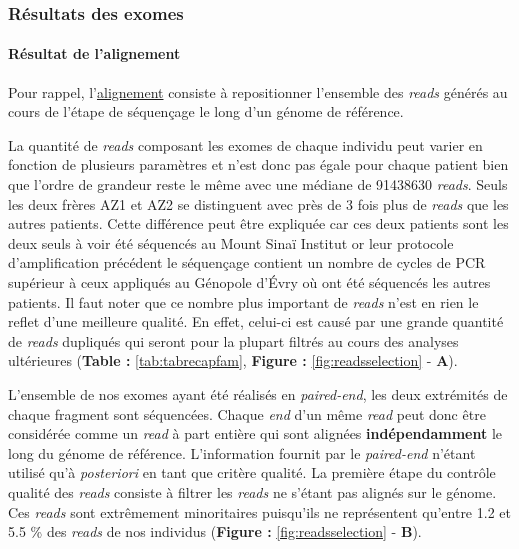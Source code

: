 \documentclass[12pt,twoside]{reedthesis}
\theoremstyle{definition}
\theoremstyle{definition}
\theoremstyle{remark}
\begin{document}
  \newpage  
  
  \subsubsection{Résultats des exomes}\label{resultats-des-exomes}
  
  \paragraph{Résultat de l'alignement}\label{resultat-de-lalignement}
  
  Pour rappel, l'\href{\%7B\#lalignement\%7D}{alignement} consiste à
  repositionner l'ensemble des \emph{reads} générés au cours de l'étape de
  séquençage le long d'un génome de référence.
  
  La quantité de \emph{reads} composant les exomes de chaque individu peut
  varier en fonction de plusieurs paramètres et n'est donc pas égale pour
  chaque patient bien que l'ordre de grandeur reste le même avec une
  médiane de 91438630 \emph{reads}. Seuls les deux frères AZ1 et AZ2 se
  distinguent avec près de 3 fois plus de \emph{reads} que les autres
  patients. Cette différence peut être expliquée car ces deux patients
  sont les deux seuls à voir été séquencés au Mount Sinaï Institut or leur
  protocole d'amplification précédent le séquençage contient un nombre de
  cycles de PCR supérieur à ceux appliqués au Génopole d'Évry où ont été
  séquencés les autres patients. Il faut noter que ce nombre plus
  important de \emph{reads} n'est en rien le reflet d'une meilleure
  qualité. En effet, celui-ci est causé par une grande quantité de
  \emph{reads} dupliqués qui seront pour la plupart filtrés au cours des
  analyses ultérieures (\textbf{Table :} \ref{tab:tabrecapfam},
  \textbf{Figure : }\ref{fig:readsselection} - \textbf{A}).
  
  L'ensemble de nos exomes ayant été réalisés en \emph{paired-end}, les
  deux extrémités de chaque fragment sont séquencées. Chaque \emph{end}
  d'un même \emph{read} peut donc être considérée comme un \emph{read} à
  part entière qui sont alignées \textbf{indépendamment} le long du génome
  de référence. L'information fournit par le \emph{paired-end} n'étant
  utilisé qu'à \emph{posteriori} en tant que critère qualité. La première
  étape du contrôle qualité des \emph{reads} consiste à filtrer les
  \emph{reads} ne s'étant pas alignés sur le génome. Ces \emph{reads} sont
  extrêmement minoritaires puisqu'ils ne représentent qu'entre 1.2 et 5.5
  \% des \emph{reads} de nos individus (\textbf{Figure :
  }\ref{fig:readsselection} - \textbf{B}).
  
\end{document}
